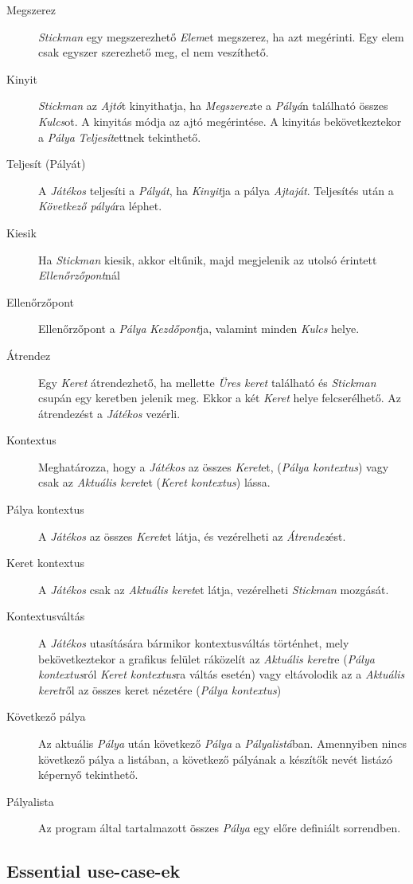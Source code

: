 \begin{description}
    \item[Megszerez] \emph{Stickman} egy megszerezhető \emph{Elem}et megszerez, ha azt megérinti. Egy elem csak egyszer szerezhető meg, el nem veszíthető.
    \item[Kinyit] \emph{Stickman} az \emph{Ajtó}t kinyithatja, ha \emph{Megszerez}te a \emph{Pályá}n található összes \emph{Kulcs}ot. A kinyitás módja az ajtó megérintése. A kinyitás bekövetkeztekor a \emph{Pálya} \emph{Teljesít}ettnek tekinthető.
    \item[Teljesít (Pályát)] A \emph{Játékos} teljesíti a \emph{Pályát}, ha \emph{Kinyit}ja a pálya \emph{Ajtaját}. Teljesítés után a \emph{Következő pályá}ra léphet.
    \item[Kiesik] Ha \emph{Stickman} kiesik, akkor eltűnik, majd megjelenik az utolsó érintett \emph{Ellenőrzőpont}nál
    \item[Ellenőrzőpont] Ellenőrzőpont a \emph{Pálya} \emph{Kezdőpont}ja, valamint minden \emph{Kulcs} helye.
    \item[Átrendez] Egy \emph{Keret} átrendezhető, ha mellette \emph{Üres keret} található és \emph{Stickman} csupán egy keretben jelenik meg. Ekkor a két \emph{Keret} helye felcserélhető. Az átrendezést a \emph{Játékos} vezérli.
    \item[Kontextus] Meghatározza, hogy a \emph{Játékos} az összes \emph{Keret}et, (\emph{Pálya kontextus}) vagy csak az \emph{Aktuális keret}et (\emph{Keret kontextus}) lássa.
    \item[Pálya kontextus] A \emph{Játékos} az összes \emph{Keret}et látja, és vezérelheti az \emph{Átrendez}ést.
    \item[Keret kontextus] A \emph{Játékos} csak az \emph{Aktuális keret}et látja, vezérelheti \emph{Stickman} mozgását.
    \item[Kontextusváltás] A \emph{Játékos} utasítására bármikor kontextusváltás történhet, mely bekövetkeztekor a grafikus felület ráközelít az \emph{Aktuális keret}re (\emph{Pálya kontextus}ról \emph{Keret kontextus}ra váltás esetén) vagy eltávolodik az a \emph{Aktuális keret}ről az összes keret nézetére (\emph{Pálya kontextus})
    \item[Következő pálya] Az aktuális \emph{Pálya} után következő \emph{Pálya} a \emph{Pályalistá}ban. Amennyiben nincs következő pálya a listában, a következő pályának a készítők nevét listázó képernyő tekinthető.
    \item[Pályalista] Az program által tartalmazott összes \emph{Pálya} egy előre definiált sorrendben.

\end{description}

\subsection{Essential use-case-ek}


